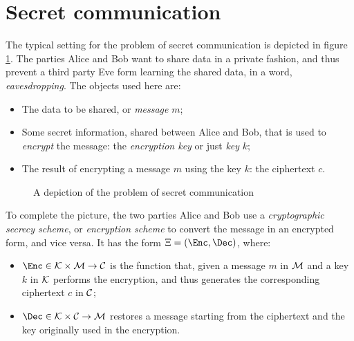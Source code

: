 
\section{Secret communication}

The typical setting for the problem of secret communication is depicted in figure \ref{fig:secrecy}. The parties Alice and Bob want to share data in a private fashion, and thus prevent a third party Eve form learning the shared data, in a word, \emph{eavesdropping}. The objects used here are:
\begin{itemize}
    \item The data to be shared, or \emph{message} $m$;
    \item Some secret information, shared between Alice and Bob, that is used to \emph{encrypt} the message: the \emph{encryption key} or just \emph{key} $k$;
    \item The result of encrypting a message $m$ using the key $k$: the ciphertext $c$.
\end{itemize}

\begin{figure}[ht]
    \centering

    \caption{A depiction of the problem of secret communication}
    \label{fig:secrecy}
\end{figure}

To complete the picture, the two parties Alice and Bob use a \emph{cryptographic secrecy scheme}, or \emph{encryption scheme} to convert the message in an encrypted form, and vice versa. It has the form $\Xi = (\Enc, \Dec)$, where:
\begin{itemize}
    \item $\Enc \in \K \times \M \to \C$ is the function that, given a message $m$ in $\mathcal{M}$ and a key $k$ in $\mathcal{K}$ performs the encryption, and thus generates the corresponding ciphertext $c$ in $\mathcal{C}$;
    \item $\Dec \in \K \times \C \to \M$ restores a message starting from the ciphertext and the key originally used in the encryption.
\end{itemize}

